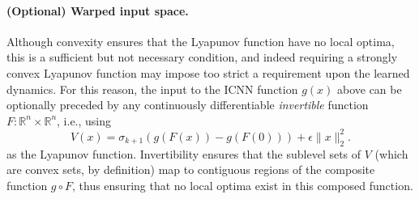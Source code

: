 \paragraph{(Optional) Warped input space.}  Although convexity ensures that the Lyapunov function have no local optima, this is a sufficient but not necessary condition, and indeed requiring a strongly convex Lyapunov function may impose too strict a requirement upon the learned dynamics.  For this reason, the input to the ICNN function $g(x)$ above can be optionally preceded by any continuously differentiable \emph{invertible} function $F : \mathbb{R}^n \times \mathbb{R}^n$, i.e., using
\begin{equation}
    V(x) = \sigma_{k+1}(g(F(x)) - g(F(0))) + \epsilon \|x\|_2^2.
    \label{eq:V_definition2}
\end{equation}
as the Lyapunov function.  Invertibility ensures that the sublevel sets of $V$ (which are convex sets, by definition) map to contiguous regions of the composite function $g \circ F$, thus ensuring that no local optima exist in this composed function.

